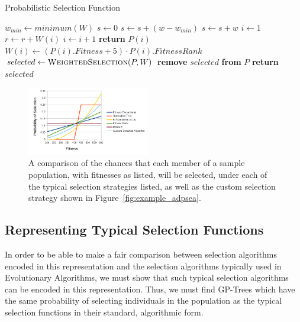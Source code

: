 \documentclass[sigconf]{acmart}
\begin{document}
\begin{algorithm}
\caption{Probabilistic Selection Function}
\label{alg:ExampleSelection}
\begin{algorithmic}[1]
 \label{proc:WeightedSelection}
	\State $w_{min} \leftarrow minimum(W)$	
	\State $s \leftarrow 0$
			\State $s \leftarrow s + (w - w_{min} )$			
		\Else
			\State $s \leftarrow s + w$		
		\EndIf	
	\EndFor
	\State $i \leftarrow 1$
		\State $r \leftarrow r + W(i)$
		\State $i \leftarrow i + 1$
	\EndWhile	
	\State \textbf{return} $P(i)$
\EndProcedure
\Statex
{}
		\State $W(i) \leftarrow (P(i).Fitness+5) \cdot P(i).FitnessRank$
	\EndFor
	\State $selected \leftarrow \Call{WeightedSelection}{P, W}$
	\State \textbf{remove} $selected$ \textbf{from} $P$ \label{line:SelectWithoutReplacementLine}
	\State \textbf{return} $selected$
\EndProcedure
\end{algorithmic}
\end{algorithm}

\begin{figure}
    \centering
    \includegraphics[width=0.475\textwidth]{selection_chances}
    \caption{A comparison of the chances that each member of a sample population, with fitnesses as listed, will be selected, under each of the typical selection strategies listed, as well as the custom selection strategy shown in Figure~\ref{fig:example_adpsea}.}
    \label{fig:selection_chances}
\end{figure}

\subsection{Representing Typical Selection Functions}
\label{Methodology-Representing Typical Selection Functions}

In order to be able to make a fair comparison between selection algorithms encoded in this representation and the selection algorithms typically used in Evolutionary Algorithms, we must show that such typical selection algorithms can be encoded in this representation. Thus, we must find GP-Trees which have the same probability of selecting individuals in the population as the typical selection functions in their standard, algorithmic form.
\end{document}
